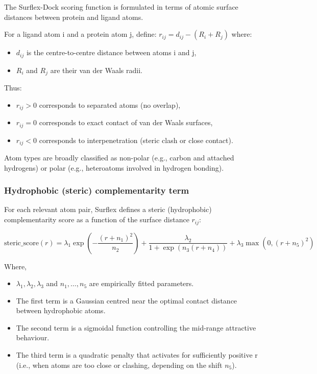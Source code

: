 \documentclass[12pt]{article}
\begin{document}
The Surflex-Dock\cite{CH7_Jain2007Surflex21} scoring function is formulated in terms of atomic surface distances between protein and ligand atoms.

For a ligand atom i and a protein atom j, define: $r_{ij} = d_{ij} - (R_i + R_j)$
where:
\begin{itemize}
  \item $d_{ij}$ is the centre-to-centre distance between atoms i and j,
  \item $R_i$ and $R_j$ are their van der Waals radii.
\end{itemize}

Thus:
\begin{itemize}
  \item $r_{ij} > 0$ corresponds to separated atoms (no overlap),
  \item $r_{ij} = 0$ corresponds to exact contact of van der Waals surfaces,
  \item $r_{ij} < 0$ corresponds to interpenetration (steric clash or close contact).
\end{itemize}

Atom types are broadly classified as non-polar (e.g., carbon and attached hydrogens) or polar (e.g., heteroatoms involved in hydrogen bonding).

\subsubsection{Hydrophobic (steric) complementarity term}

For each relevant atom pair, Surflex defines a steric (hydrophobic) complementarity score\cite{CH7_Jain2007Surflex21} as a function of the surface distance $r_{ij}$:

\begin{equation}
  \textrm{steric\_score}(r)
  =
  \lambda_{1} \exp\!\left(
    -\frac{\left(r + n_{1}\right)^{2}}{n_{2}}
  \right)
  +
  \frac{\lambda_{2}}{
    1 + \exp\!\left(
      n_{3} \left( r + n_{4} \right)
    \right)
  }
  +
  \lambda_{3} \max\!\left( 0,\left( r + n_{5} \right)^{2} \right)
  \label{eq:steric}
\end{equation}

Where,
\begin{itemize}
  \item $\lambda_{1}, \lambda_{2}, \lambda_{3}$ and $n_{1}, \dots, n_{5}$ are empirically fitted parameters.
  \item The first term is a Gaussian centred near the optimal contact distance between hydrophobic atoms.
  \item The second term is a sigmoidal function controlling the mid-range attractive behaviour.
  \item The third term is a quadratic penalty that activates for sufficiently positive r (i.e., when atoms are too close or clashing, depending on the shift $n_5$).
\end{itemize}
\end{document}
